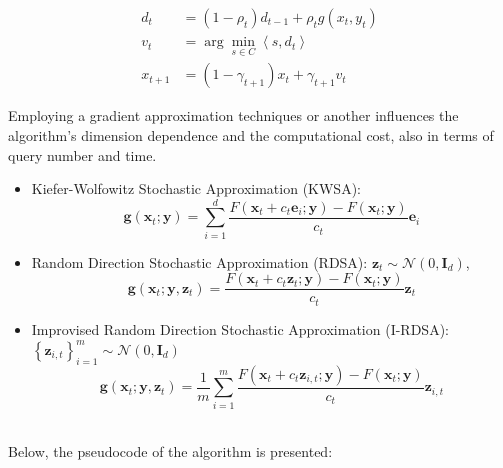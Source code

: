 \documentclass[10pt,twocolumn,letterpaper]{article}
\begin{document}
\[
\begin{aligned}
d_{t} & =\left(1-\rho_{t}\right) d_{t-1}+\rho_{t} g\left(x_{t}, y_{t}\right) \\
v_{t} & =\arg \min _{s \in C}\left\langle s, d_{t}\right\rangle \\
x_{t+1} & =\left(1-\gamma_{t+1}\right) x_{t}+\gamma_{t+1} v_{t}
\end{aligned}
\]

Employing a gradient approximation techniques or another influences the 
algorithm's dimension dependence and the computational cost, also in terms of query number and time.

\begin{itemize}
   \item {Kiefer-Wolfowitz Stochastic Approximation (KWSA)}:
   \[
   \mathbf{g}\left(\mathbf{x}_{t} ; \mathbf{y}\right)=\sum_{i=1}^{d} \frac{F\left(\mathbf{x}_{t}+c_{t} \mathbf{e}_{i} ; \mathbf{y}\right)-F\left(\mathbf{x}_{t} ; \mathbf{y}\right)}{c_{t}} \mathbf{e}_{i}
   \]
   \item {Random Direction Stochastic Approximation (RDSA)}: \newline
    $\mathbf{z}_{t} \sim \mathcal{N}\left(0, \mathbf{I}_{d}\right)$,
   \[
   \mathbf{g}\left(\mathbf{x}_{t} ; \mathbf{y}, \mathbf{z}_{t}\right)=\frac{F\left(\mathbf{x}_{t}+c_{t} \mathbf{z}_{t} ; \mathbf{y}\right)-F\left(\mathbf{x}_{t} ; \mathbf{y}\right)}{c_{t}} \mathbf{z}_{t}
   \]

   \item {Improvised Random Direction Stochastic Approximation (I-RDSA)}: \newline
   $\left\{\mathbf{z}_{i, t}\right\}_{i=1}^{m} \sim \mathcal{N}\left(0, \mathbf{I}_{d}\right)$ \newline
   \[
      \mathbf{g}\left(\mathbf{x}_{t} ; \mathbf{y}, \mathbf{z}_{t}\right)=\frac{1}{m} \sum_{i=1}^{m} \frac{F\left(\mathbf{x}_{t}+c_{t} \mathbf{z}_{i, t} ; \mathbf{y}\right)-F\left(\mathbf{x}_{t} ; \mathbf{y}\right)}{c_{t}} \mathbf{z}_{i, t}
   \]
\end{itemize} \\

Below, the pseudocode of the algorithm is presented: \\
\end{document}
